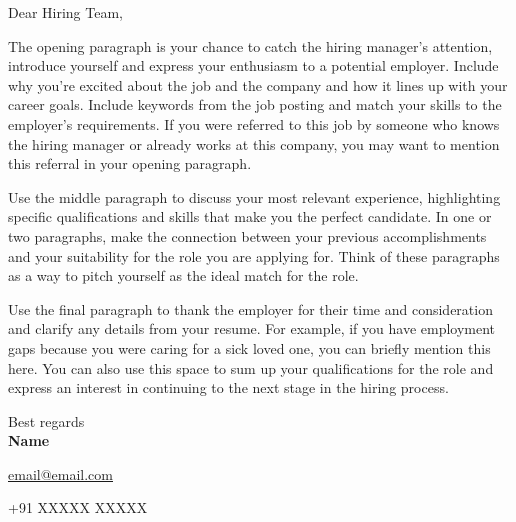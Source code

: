\documentclass[12pt, a4paper]{styles}
\begin{document}
%
\makecvheader


Dear Hiring Team, %
\medskip

The opening paragraph is your chance to catch the hiring manager’s attention, introduce yourself and express your enthusiasm to a potential employer. Include why you’re excited about the job and the company and how it lines up with your career goals. Include keywords from the job posting and match your skills to the employer’s requirements. If you were referred to this job by someone who knows the hiring manager or already works at this company, you may want to mention this referral in your opening paragraph.
\medskip

Use the middle paragraph to discuss your most relevant experience, highlighting specific qualifications and skills that make you the perfect candidate. In one or two paragraphs, make the connection between your previous accomplishments and your suitability for the role you are applying for. Think of these paragraphs as a way to pitch yourself as the ideal match for the role. 
\medskip

Use the final paragraph to thank the employer for their time and consideration and clarify any details from your resume. For example, if you have employment gaps because you were caring for a sick loved one, you can briefly mention this here. You can also use this space to sum up your qualifications for the role and express an interest in continuing to the next stage in the hiring process.
\medskip

\begin{flushright}
Best regards\\
\textbf{Name}
\medskip

{\href{mailto:email@email.com}{email@email.com}} 
\medskip

{+91 XXXXX XXXXX} 
\end{flushright}
\end{document}
